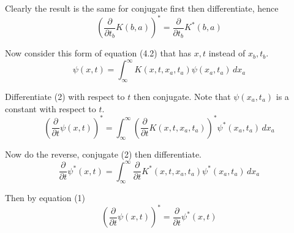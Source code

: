 \documentclass[12pt]{article}
\begin{document}
Clearly the result is the same for conjugate first then differentiate, hence
\begin{equation*}
\left(\frac{\partial}{\partial t_b}K(b,a)\right)^*
=\frac{\partial}{\partial t_b}K^*(b,a)
\tag{1}
\end{equation*}

Now consider this form of equation (4.2) that has $x,t$ instead of $x_b,t_b$.
\begin{equation*}
\psi(x,t)=\int_{\infty}^\infty K(x,t,x_a,t_a)\psi(x_a,t_a)\,dx_a
\tag{2}
\end{equation*}

Differentiate (2) with respect to $t$ then conjugate.
Note that $\psi(x_a,t_a)$ is a constant with respect to $t$.
\begin{equation*}
\left(\frac{\partial}{\partial t}\psi(x,t)\right)^*
=\int_{\infty}^\infty\left(\frac{\partial}{\partial t}K(x,t,x_a,t_a)\right)^*\psi^*(x_a,t_a)\,dx_a
\end{equation*}

Now do the reverse, conjugate (2) then differentiate.
\begin{equation*}
\frac{\partial}{\partial t}\psi^*(x,t)
=\int_{\infty}^\infty\frac{\partial}{\partial t}K^*(x,t,x_a,t_a)\psi^*(x_a,t_a)\,dx_a
\end{equation*}

Then by equation (1)
\begin{equation*}
\left(\frac{\partial}{\partial t}\psi(x,t)\right)^*=\frac{\partial}{\partial t}\psi^*(x,t)
\end{equation*}
\end{document}
